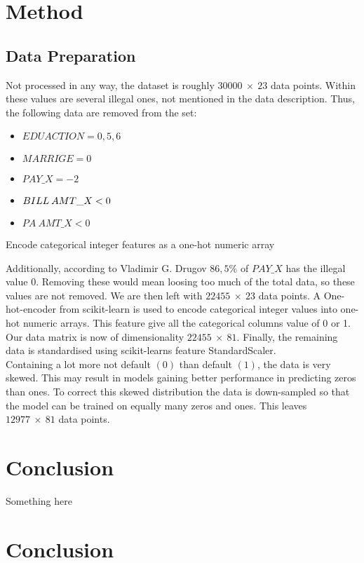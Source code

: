 \documentclass[a4paper,11pt,twocolumn]{article}
\begin{document}
\section{Method}

\subsection{Data Preparation} 
Not processed in any way, the dataset is roughly $30000\: \times\: 23$ data points. Within these values are several illegal ones, not mentioned in the data description. Thus, the following data are removed from the set:
\begin{itemize}
\item[] $EDUACTION = 0,5,6$
\item[] $MARRIGE = 0$
\item[] $PAY\_X = -2$
\item[] $BILL\:AMT\text\_X < 0$
\item[] $PA\:AMT\_X < 0$
\end{itemize}
Encode categorical integer features as a one-hot numeric array

Additionally, according to Vladimir G. Drugov \cite{vladimir} $86,5 \%$ of $PAY\_X$ has the illegal value 0. 
Removing these would mean loosing too much of the total data, so these values are not removed. We are then left with $22455\: \times\: 23$ data points.
A One-hot-encoder from scikit-learn is used to encode categorical integer values into one-hot numeric arrays. This feature give all the categorical columns value of 0 or 1. Our data matrix is now of dimensionality $22455\: \times\: 81$. Finally, the remaining data is standardised using scikit-learns feature StandardScaler. 
\\ 
Containing a lot more not default $(0)$ than default $(1)$, the data is very skewed. This may result in models gaining better performance in predicting zeros than ones. To correct this skewed distribution the data is down-sampled so that the model can be trained on equally many zeros and ones. This leaves $12977\: \times\: 81$ data points. 

\section{Conclusion}
Something here

\section{Conclusion}
\end{document}

